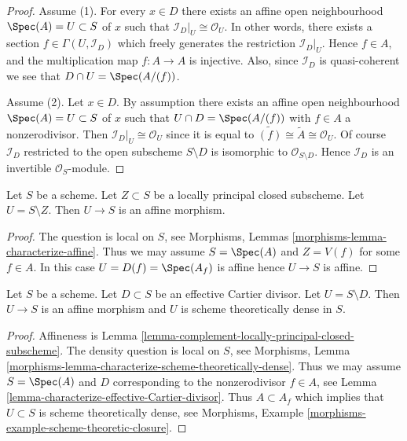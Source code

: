 \begin{proof}
Assume (1).  For every $x \in D$ there exists an affine open neighbourhood
$\Spec(A) = U \subset S$ of $x$ such that
$\mathcal{I}_D|_U \cong \mathcal{O}_U$. In other words, there exists
a section $f \in \Gamma(U, \mathcal{I}_D)$ which freely generates the
restriction $\mathcal{I}_D|_U$. Hence $f \in A$, and the multiplication
map $f : A \to A$ is injective. Also, since $\mathcal{I}_D$ is
quasi-coherent we see that $D \cap U = \Spec(A/(f))$.

\medskip\noindent
Assume (2). Let $x \in D$. By assumption there exists an affine open
neighbourhood $\Spec(A) = U \subset S$ of $x$ such that
$U \cap D = \Spec(A/(f))$ with $f \in A$ a nonzerodivisor.
Then $\mathcal{I}_D|_U \cong \mathcal{O}_U$ since it is equal to
$\widetilde{(f)} \cong \widetilde{A} \cong \mathcal{O}_U$.
Of course $\mathcal{I}_D$ restricted to the open subscheme
$S \setminus D$ is isomorphic to $\mathcal{O}_{S \setminus D}$.
Hence $\mathcal{I}_D$ is an invertible $\mathcal{O}_S$-module.
\end{proof}

\begin{lemma}
\label{lemma-complement-locally-principal-closed-subscheme}
Let $S$ be a scheme. Let $Z \subset S$ be a locally principal closed
subscheme. Let $U = S \setminus Z$. Then $U \to S$ is an affine morphism.
\end{lemma}

\begin{proof}
The question is local on $S$, see
Morphisms, Lemmas \ref{morphisms-lemma-characterize-affine}.
Thus we may assume $S = \Spec(A)$ and $Z = V(f)$ for some $f \in A$.
In this case $U = D(f) = \Spec(A_f)$ is affine hence $U \to S$ is affine.
\end{proof}

\begin{lemma}
\label{lemma-complement-effective-Cartier-divisor}
Let $S$ be a scheme. Let $D \subset S$ be an effective Cartier divisor.
Let $U = S \setminus D$. Then $U \to S$ is an affine morphism and $U$
is scheme theoretically dense in $S$.
\end{lemma}

\begin{proof}
Affineness is Lemma \ref{lemma-complement-locally-principal-closed-subscheme}.
The density question is local on $S$, see
Morphisms, Lemma \ref{morphisms-lemma-characterize-scheme-theoretically-dense}.
Thus we may assume $S = \Spec(A)$ and $D$ corresponding to the
nonzerodivisor $f \in A$, see
Lemma \ref{lemma-characterize-effective-Cartier-divisor}.
Thus $A \subset A_f$ which implies that $U \subset S$ is
scheme theoretically dense, see
Morphisms, Example \ref{morphisms-example-scheme-theoretic-closure}.
\end{proof}

